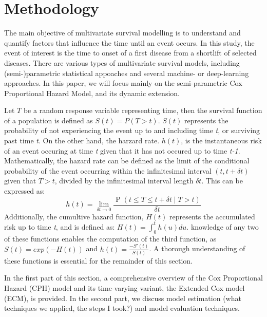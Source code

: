 \chapter{Methodology}
\label{chap:methodology}
The main objective of multivariate survival modelling is to understand and quantify factors that influence the time until an event occurs. In this study, the event of interest is the time to onset of a first disease from a shortlift of selected diseases. There are various types of multivariate survival models, including (semi-)parametric statistical appoaches and several machine- or deep-learning approaches. In this paper, we will focus mainly on the semi-parametric Cox Proportional Hazard Model, and its dynamic extension. 

Let $T$ be a random response variable representing time, then the survival function of a population is defined as \begin{math}
    S(t) = P(T>t)
\end{math}. $S(t)$ represents the probability of not experiencing the event up to and including time \textit{t}, or surviving past time \textit{t}. On the other hand, the harzard rate. $h(t)$, is the instantaneous risk of an event occuring at time \textit{t} given that it has not occured up to time \textit{t-1}. Mathematically, the hazard rate can be defined as the limit of the conditional probability of the event occurring within the infinitesimal interval $(t, t+\delta t)$ given that $T > t$, divided by the infinitesimal interval length $\delta t$. This can be expressed as:
$$
h(t)=\lim _{\delta t \rightarrow 0} \frac{\operatorname{P}(t \leq T \leq t+\delta t \mid T>t)}{\delta t}
$$
Additionally, the cumultive hazard function, $H(t)$ represents the accumulated risk up to time \textit{t}, and is defined as: $H(t) = \int_{0}^{t}h(u)du$. knowledge of any two of these functions enables the computation of the third function, as $S(t) = exp(-H(t))$ and $h(t) = \frac{-S'(t)}{S(t)}$. A thorough understanding of these functions is essential for the remainder of this section. 

In the first part of this section, a comprehensive overview of the Cox Proportional Hazard (CPH) model and its time-varying variant, the Extended Cox model (ECM), is provided. In the second part, we discuss model estimation (what techniques we applied, the steps I took?) and model evaluation techniques. 

